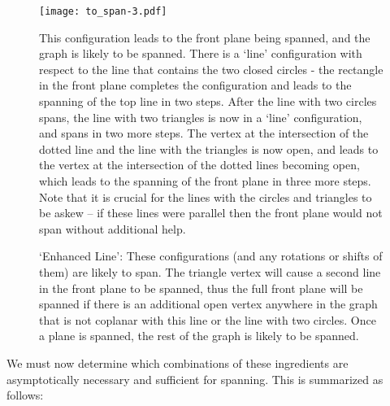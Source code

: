 \begin{figure}[htd]
	\centering
	\texttt{[image: to\_span-3.pdf]}
	\caption{This configuration leads to the front plane being spanned, and the graph is likely to be spanned.  There is a `line' configuration with respect to the line that contains the two closed circles - the rectangle in the front plane completes the configuration and leads to the spanning of the top line in two steps.  After the line with two circles spans, the line with two triangles is now in a `line' configuration, and spans in two more steps.  The vertex at the intersection of the dotted line and the line with the triangles is now open, and leads to the vertex at the intersection of the dotted lines becoming open, which leads to the spanning of the front plane in three more steps.  Note that it is crucial for the lines with the circles and triangles to be askew -- if these lines were parallel then the front plane would not span without additional help.}
	\label{tospan3}
\end{figure}

\begin{figure}[htd]
	\centering
	\hspace{.1in}
	\hspace{.1in}
	\caption{`Enhanced Line': These configurations (and any rotations or shifts of them) are likely to span.  The triangle vertex will cause a second line in the front plane to be spanned, thus the full front plane will be spanned if there is an additional open vertex anywhere in the graph that is not coplanar with this line or the line with two circles.  Once a plane is spanned, the rest of the graph is likely to be spanned.}
	\label{tospan5}
\end{figure}

We must now determine which combinations of these ingredients are asymptotically necessary and sufficient for spanning.  This is summarized as follows:


